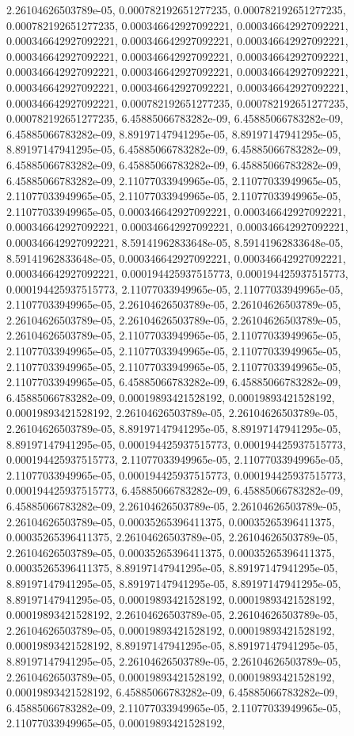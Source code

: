 \documentclass[
  ,man]{apa6}
\begin{document}
2.26104626503789e-05, 0.000782192651277235, 0.000782192651277235, 0.000782192651277235, 0.000346642927092221, 0.000346642927092221, 0.000346642927092221, 0.000346642927092221, 0.000346642927092221, 0.000346642927092221, 0.000346642927092221, 0.000346642927092221, 0.000346642927092221, 0.000346642927092221, 0.000346642927092221, 0.000346642927092221, 0.000346642927092221, 0.000346642927092221, 0.000346642927092221, 0.000782192651277235, 0.000782192651277235, 0.000782192651277235, 6.45885066783282e-09,
6.45885066783282e-09, 6.45885066783282e-09, 8.89197147941295e-05, 8.89197147941295e-05, 8.89197147941295e-05, 6.45885066783282e-09, 6.45885066783282e-09, 6.45885066783282e-09, 6.45885066783282e-09, 6.45885066783282e-09, 6.45885066783282e-09, 2.11077033949965e-05, 2.11077033949965e-05, 2.11077033949965e-05, 2.11077033949965e-05, 2.11077033949965e-05, 2.11077033949965e-05, 0.000346642927092221, 0.000346642927092221, 0.000346642927092221, 0.000346642927092221, 0.000346642927092221, 0.000346642927092221,
8.59141962833648e-05, 8.59141962833648e-05, 8.59141962833648e-05, 0.000346642927092221, 0.000346642927092221, 0.000346642927092221, 0.000194425937515773, 0.000194425937515773, 0.000194425937515773, 2.11077033949965e-05, 2.11077033949965e-05, 2.11077033949965e-05, 2.26104626503789e-05, 2.26104626503789e-05, 2.26104626503789e-05, 2.26104626503789e-05, 2.26104626503789e-05, 2.26104626503789e-05, 2.11077033949965e-05, 2.11077033949965e-05, 2.11077033949965e-05, 2.11077033949965e-05, 2.11077033949965e-05,
2.11077033949965e-05, 2.11077033949965e-05, 2.11077033949965e-05, 2.11077033949965e-05, 6.45885066783282e-09, 6.45885066783282e-09, 6.45885066783282e-09, 0.00019893421528192, 0.00019893421528192, 0.00019893421528192, 2.26104626503789e-05, 2.26104626503789e-05, 2.26104626503789e-05, 8.89197147941295e-05, 8.89197147941295e-05, 8.89197147941295e-05, 0.000194425937515773, 0.000194425937515773, 0.000194425937515773, 2.11077033949965e-05, 2.11077033949965e-05, 2.11077033949965e-05, 0.000194425937515773,
0.000194425937515773, 0.000194425937515773, 6.45885066783282e-09, 6.45885066783282e-09, 6.45885066783282e-09, 2.26104626503789e-05, 2.26104626503789e-05, 2.26104626503789e-05, 0.00035265396411375, 0.00035265396411375, 0.00035265396411375, 2.26104626503789e-05, 2.26104626503789e-05, 2.26104626503789e-05, 0.00035265396411375, 0.00035265396411375, 0.00035265396411375, 8.89197147941295e-05, 8.89197147941295e-05, 8.89197147941295e-05, 8.89197147941295e-05, 8.89197147941295e-05, 8.89197147941295e-05, 0.00019893421528192,
0.00019893421528192, 0.00019893421528192, 2.26104626503789e-05, 2.26104626503789e-05, 2.26104626503789e-05, 0.00019893421528192, 0.00019893421528192, 0.00019893421528192, 8.89197147941295e-05, 8.89197147941295e-05, 8.89197147941295e-05, 2.26104626503789e-05, 2.26104626503789e-05, 2.26104626503789e-05, 0.00019893421528192, 0.00019893421528192, 0.00019893421528192, 6.45885066783282e-09, 6.45885066783282e-09, 6.45885066783282e-09, 2.11077033949965e-05, 2.11077033949965e-05, 2.11077033949965e-05, 0.00019893421528192,
\end{document}
